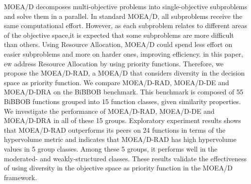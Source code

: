 MOEA/D decomposes multi-objective problems into single-objective subproblems and solve them in a parallel. In standard MOEA/D, all subproblems receive the same computational effort. However, as each subproblem relates to different areas of the objective space,it is expected that some subproblems are more difficult than others. Using Resource Allocation, MOEA/D could spend less effort on easier subproblems and more on harder ones, improving efficiency. in this paper, ew address Resource Allocation by using priority functions. Therefore, we propose the MOEA/D-RAD, a MOEA/D that considers diversity in the decision space as priority function. We compare MOEA/D-RAD, MOEA/D-DE and MOEA/D-DRA on the BiBBOB benchmark. This benchmark is composed of 55 BiBBOB functions grouped into 15 function classes, given similarity properties. We investigate the performance of MOEA/D-RAD, MOEA/D-DE and MOEA/D-DRA in all of these 15 groups. Exploratory experiment results shows that MOEA/D-RAD outperforms its peers on 24 functions in terms of the hypervolume metric and indicates that MOEA/D-RAD has high hypervolume values in 5 group classes. Among these 5 groups, it performs well in the moderated- and weakly-structured classes. These results validate the effectiveness of using diversity in the objective space as priority function in the MOEA/D framework.